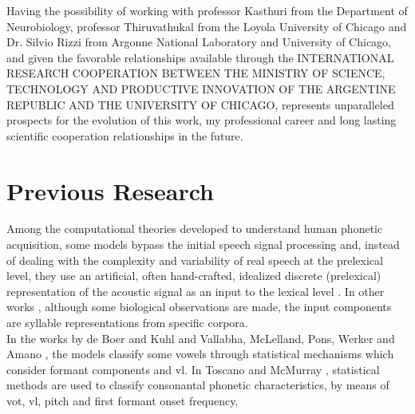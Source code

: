 \documentclass[11pt,a4paper]{article}
\begin{document}
Having the possibility of working with professor
Kasthuri from the Department of Neurobiology,
professor Thiruvathukal from the  Loyola University of Chicago and
Dr. Silvio Rizzi from Argonne National Laboratory and University of Chicago,
and given the favorable relationships available through the
INTERNATIONAL RESEARCH COOPERATION BETWEEN THE MINISTRY OF SCIENCE,
TECHNOLOGY AND PRODUCTIVE INNOVATION
OF THE ARGENTINE REPUBLIC
AND
THE UNIVERSITY OF CHICAGO,
represents unparalleled prospects for the
evolution of this work, my professional career
and long lasting scientific cooperation
relationships in the future. \\

























\section{Previous Research}

Among the computational theories developed to understand
human phonetic acquisition, some models bypass the initial
speech signal processing and,
instead of dealing with the complexity and variability of real speech
at the prelexical level, they use an artificial, often hand-crafted, 
idealized discrete (prelexical) representation of the acoustic
signal as an input to the lexical level \cite{scharenborg_2010}.
In other works \cite{dominey_2000}, although some biological observations are made,
the input components are syllable representations from specific corpora.\\

In the works by de Boer and Kuhl \cite{boer_2003} and Vallabha, McLelland, Pons,
Werker and Amano \cite{vallabha_2007}, the models classify some vowels
through statistical mechanisms which consider formant components
and \gls{vl}.
In Toscano and McMurray \cite{toscano_2010},
statistical methods are used to classify consonantal phonetic
characteristics, by means of \gls{vot},
\gls{vl}, pitch and first formant onset frequency. \\
\end{document}
